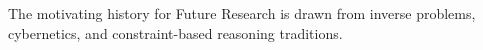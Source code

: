 The motivating history for Future Research is drawn from inverse problems, cybernetics, and constraint-based reasoning traditions.
